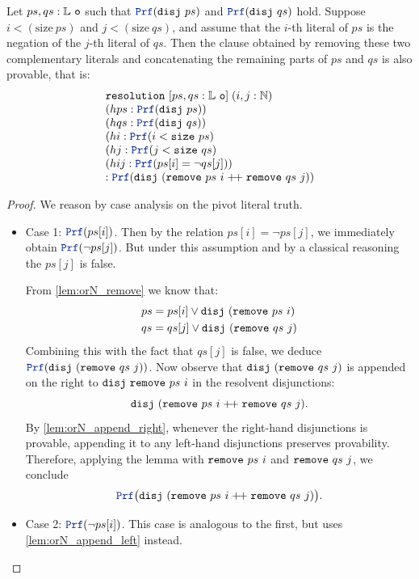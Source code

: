 \begin{theorem}[Resolution]\label{th:resolution}
Let $ps, qs: \mathbb{L}~\texttt{o}$ such that $\prf(\kw{disj}~ps)$ and $\prf(\kw{disj}~qs)$ hold.
Suppose $i < (\mathrm{size}~ps)$ and $j < (\mathrm{size}~qs)$, and assume that the $i$-th literal of $ps$ is the negation of the $j$-th literal of $qs$.
Then the clause obtained by removing these two complementary literals and  concatenating the remaining parts of $ps$ and $qs$ is also provable, that is:
\[
\begin{array}{l}
  \tt{resolution}~[ps, qs : \List{o}]\; (i, j : \mathbb{N}) \\
  (hps : \prf(\kw{disj}~ps)) \\
  (hqs : \prf(\kw{disj}~qs)) \\
  (hi  : \prf(i < \tt{size}~ps) \\
  (hj  : \prf(j < \tt{size}~qs) \\
  (hij : \prf(ps[i] = \lnot qs[j])) \\
  : \prf(\kw{disj}~(\tt{remove}~ps~i \;\pp\; \tt{remove}~qs~j))
\end{array}
\]
\begin{proof}
We reason by case analysis on the pivot literal truth.

\begin{itemize}
\item[] Case 1: \(\prf(ps[i])\).
  Then by the relation $ps[i] = \lnot ps[j]$, we immediately obtain $\prf(\lnot ps[j])$.
  But under this assumption and by a classical reasoning the $ps[j]$ is false.

  From \cref{lem:orN_remove} we know that:
  \begin{align*}
  &ps = ps[i] \lor \texttt{\upshape{disj}}~(\texttt{\upshape{remove}}~ps~i) \\
  &qs = qs[j] \lor \texttt{\upshape{disj}}~(\texttt{\upshape{remove}}~qs~j)
  \end{align*}
  Combining this with the fact that $qs[j]$ is false, we deduce $\prf(\kw{disj}~(\kw{remove}~qs~j))$.
  Now observe that $\texttt{\upshape{disj}}~(\texttt{\upshape{remove}}~qs~j)$ is appended on the right to $\texttt{\upshape{disj}}~\texttt{\upshape{remove}}~ps~i$
  in the resolvent disjunctions:
  \[
    \texttt{\upshape{disj}}~(\texttt{\upshape{remove}}~ps~i \; {+}\!{+} \; \texttt{\upshape{remove}}~qs~j).
  \]
  By \cref{lem:orN_append_right}, whenever the right-hand disjunctions is provable,
  appending it to any left-hand disjunctions preserves provability.
  Therefore, applying the lemma with $\texttt{\upshape{remove}}~ps~i$ and $\texttt{\upshape{remove}}~qs~j$,
  we conclude
  \[
    \prf \bigl( \kw{disj}~(\kw{remove}~ps~i \;\pp\; \kw{remove}~qs~j) \bigr).
  \]
\item[] Case 2: \(\prf(\lnot ps[i])\). This case is analogous to the first, but uses \cref{lem:orN_append_left} instead.
\end{itemize}
\end{proof}
\end{theorem}


